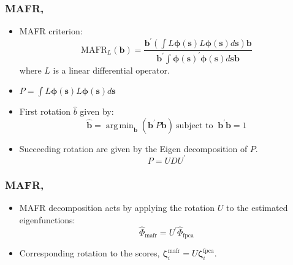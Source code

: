 \documentclass[aspectratio=169]{beamer}
\newcommand{\ve}[1]{\bm{{#1}}}
\DeclareMathOperator*{\argmin}{arg\,min}
\begin{document}
  \begin{frame}
    \frametitle{MAFR, \cite{hooker_maximal_2016}}
      \begin{itemize}
        \item MAFR criterion:
          \begin{equation}
          \text{MAFR}_L(\ve{b}) = \frac{\ve{b}^\prime \left( \int L\ve{\phi}(\ve{s}) L \ve{\phi}(\ve{s}) d\ve{s}\right) \ve{b}}{\ve{b}^\prime \int \ve{\phi}(\ve{s})^\prime \ve{\phi}(\ve{s}) d\ve{s} \ve{b}}
            \label{eqn:mafr}
          \end{equation}
          where $L$ is a linear differential operator. 
        \item $P = \int  L\ve{\phi}(\ve{s}) L \ve{\phi}(\ve{s}) d\ve{s}$
        \item First rotation $\hat{b}$ given by:
          \begin{equation}
            \hat{\ve{b}} = \argmin_{\ve{b}} \left( \ve{b}^\prime P \ve{b} \right)~\text{subject to }~\ve{b}^\prime \ve{b} = 1
            \label{eqn:mafr_rot}
          \end{equation}
        \item Succeeding rotation are given by the Eigen decomposition of $P$.
          \begin{equation}
            P = U D U^\prime
            \label{eqn:P}
          \end{equation}
      \end{itemize}
  \end{frame}
  
  \begin{frame}
    \frametitle{MAFR, \cite{hooker_maximal_2016}}
      \begin{itemize}
        \item MAFR decomposition acts by applying the rotation $U$ to the estimated eigenfunctions:
          \begin{equation}
            \hat{\Phi}_\text{mafr} = U^\prime \hat{\Phi}_\text{fpca}
            \label{eqn:mafr}
          \end{equation}
        \item Corresponding rotation to the scores, $\ve{\zeta}_{i}^\text{mafr} = U \ve{\zeta}_{i}^\text{fpca}$.
      \end{itemize}
  \end{frame}
\end{document}
